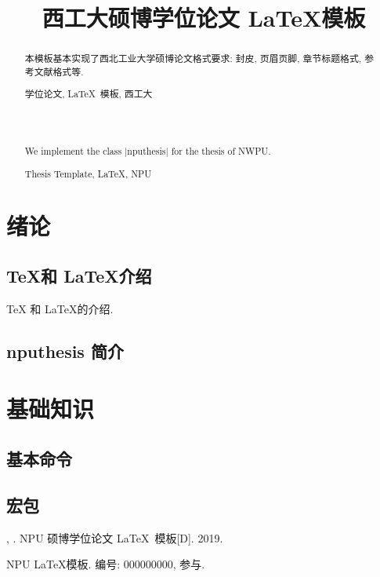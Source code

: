 \documentclass[oneside, UTF8, phd, AutoFakeBold]{nputhesis}
\title[\LaTeX\ Template of NPU Thesis]{西工大硕博学位论文 \LaTeX 模板}
\author[\dbr{San Zhang}]{\dbr{张三}}
\begin{document}
\makecover
\frontmatter

\begin{abstract}
  本模板基本实现了西北工业大学硕博论文格式要求: 封皮, 页眉页脚,
  章节标题格式, 参考文献格式等.
  \begin{keywords}
    学位论文, \LaTeX\ 模板, 西工大
  \end{keywords}
\end{abstract}
\begin{Abstract}
  We implement the class |nputhesis| for the thesis of NWPU.
  \begin{Keywords}
    Thesis Template, \LaTeX, NPU
  \end{Keywords}
\end{Abstract}

\tableofcontents
\printnomenclature

\mainmatter

\chapter{绪论}
\section{\TeX 和 \LaTeX 介绍}
\TeX \parencite{Knuth1986} 和 \LaTeX \cite{Lamport1994, Liu2013}的介绍.
\section{nputhesis 简介}
\chapter{基础知识}
\section{基本命令}
\section{宏包}

\backmatter

\printbibliography             %

\Appendix   %

\Appendix*  %

\Thanks     %

\Work
\papersection  %

\begin{npulist}
  \item {\bf {}}, . NPU 硕博学位论文
    \LaTeX\ 模板[D]. 2019.
\end{npulist}

\researchsection %
\begin{npulist}
  \item NPU \LaTeX 模板.   编号: 000000000, 参与.
\end{npulist}
\statement
\end{document}
